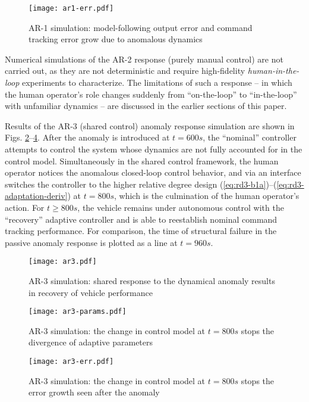 \begin{figure}[htbp]
	\centering
	\texttt{[image: ar1-err.pdf]}
	\caption{AR-1 simulation: model-following output error and command tracking error grow due to anomalous dynamics}
	\label{fig:ar1-err}
\end{figure}

Numerical simulations of the AR-2 response (purely manual control) are not carried out, as they are not deterministic and require high-fidelity \textit{human-in-the-loop} experiments to characterize. The limitations of such a response -- in which the human operator's role changes suddenly from ``on-the-loop'' to ``in-the-loop'' with unfamiliar dynamics -- are discussed in the earlier sections of this paper.

Results of the AR-3 (shared control) anomaly response simulation are shown in Figs. \ref{fig:ar3-sim}--\ref{fig:ar3-err}. After the anomaly is introduced at $t = 600 s$, the ``nominal'' controller attempts to control the system whose dynamics are not fully accounted for in the control model. Simultaneously in the shared control framework, the human operator notices the anomalous closed-loop control behavior, and via an interface switches the controller to the higher relative degree design (\ref{eq:rd3-b1a})--(\ref{eq:rd3-adaptation-deriv}) at $t = 800 s$, which is the culmination of the human operator's action. For $t \geq 800 s$, the vehicle remains under autonomous control with the ``recovery'' adaptive controller and is able to reestablish nominal command tracking performance. For comparison, the time of structural failure in the passive anomaly response is plotted as a line at $t = 960 s$.

\begin{figure}[htbp]
	\centering
	\texttt{[image: ar3.pdf]}
	\caption{AR-3 simulation: shared response to the dynamical anomaly results in recovery of vehicle performance}
	\label{fig:ar3-sim}
\end{figure}

\begin{figure}[htbp]
	\centering
	\texttt{[image: ar3-params.pdf]}
	\caption{AR-3 simulation: the change in control model at $t = 800 s$ stops the divergence of adaptive parameters}
	\label{fig:ar3-params}
\end{figure}

\begin{figure}[htbp]
	\centering
	\texttt{[image: ar3-err.pdf]}
	\caption{AR-3 simulation: the change in control model at $t = 800 s$ stops the error growth seen after the anomaly}
	\label{fig:ar3-err}
\end{figure}
